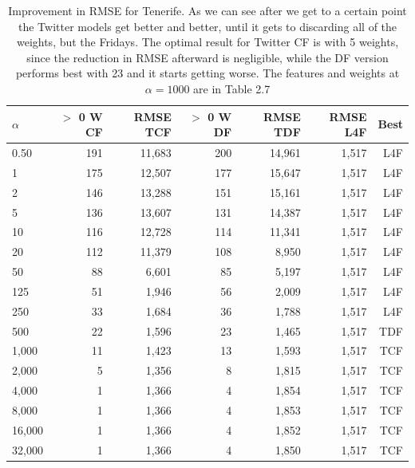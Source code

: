 \documentclass[minf,frontabs,twoside,singlespacing,parskip]{infthesis}
\begin{document}
\begin{table}[h]
\begin{center}
\begin{tabular}{ l | r | r | r | r | r | r}
$\alpha$ & $>$ 0 W CF & RMSE TCF & $>$ 0 W DF & RMSE TDF & RMSE L4F & Best\\
\hline
0.50 & 191 & 11,683 & 200 & 14,961 & 1,517 & L4F\\
1 & 175 & 12,507 & 177 & 15,647 & 1,517 & L4F\\
2 & 146 & 13,288 & 151 & 15,161 & 1,517 & L4F\\
5 & 136 & 13,607 & 131 & 14,387 & 1,517 & L4F\\
10 & 116 & 12,728 & 114 & 11,341 & 1,517 & L4F\\
20 & 112 & 11,379 & 108 & 8,950 & 1,517 & L4F\\
50 & 88 & 6,601 & 85 & 5,197 & 1,517 & L4F\\
125 & 51 & 1,946 & 56 & 2,009 & 1,517 & L4F\\
250 & 33 & 1,684 & 36 & 1,788 & 1,517 & L4F\\
\hline
500 & 22 & 1,596 & 23 & 1,465 & 1,517 & TDF\\
1,000 & 11 & 1,423 & 13 & 1,593 & 1,517 & TCF\\
2,000 & 5 & 1,356 & 8 & 1,815 & 1,517 & TCF\\
4,000 & 1 & 1,366 & 4 & 1,854 & 1,517 & TCF\\
8,000 & 1 & 1,366 & 4 & 1,853 & 1,517 & TCF\\
16,000 & 1 & 1,366 & 4 & 1,852 & 1,517 & TCF\\
32,000 & 1 & 1,366 & 4 & 1,850 & 1,517 & TCF\\
\end{tabular}
\end{center}
\caption{Improvement in RMSE for Tenerife. As we can see after we get to a certain point the Twitter models get better and better, until it gets to discarding all of the weights, but the Fridays. The optimal result for Twitter CF is with 5 weights, since the reduction in RMSE afterward is negligible, while the DF version performs best with 23 and it starts getting worse. The features and weights at $\alpha = 1000$ are in Table 2.7}
\end{table}
\end{document}
